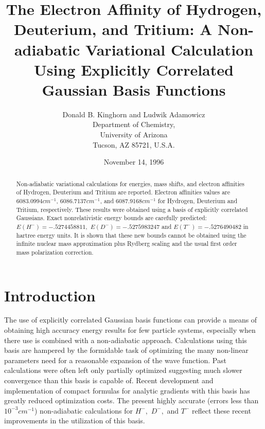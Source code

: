 \documentclass[12pt,thmsa]{article}
\begin{document}
\author{Donald B. Kinghorn and Ludwik Adamowicz \\
Department of Chemistry, \\
University of Arizona \\
Tucson, AZ 85721, U.S.A.}
\title{The Electron Affinity of Hydrogen, Deuterium, and Tritium: A Non-adiabatic
Variational Calculation Using Explicitly Correlated Gaussian Basis Functions}
\date{November 14, 1996}
\maketitle

\begin{abstract}
Non-adiabatic variational calculations for energies, mass shifts, and
electron affinities of Hydrogen, Deuterium and Tritium are reported.
Electron affinities values are 6083.0994$cm^{-1}$, 6086.7137$cm^{-1}$, and
6087.9168$cm^{-1}$ for Hydrogen, Deuterium and Tritium, respectively. These
results were obtained using a basis of explicitly correlated Gaussians.
Exact nonrelativistic energy bounds are carefully predicted: $E\left(
H^{-}\right) =-.5274458811,\,\,E\left( D^{-}\right) =-.5275983247$ and $%
E\left( T^{-}\right) =-.5276490482$ in hartree energy units. It is shown
that these new bounds cannot be obtained using the infinite nuclear mass
approximation plus Rydberg scaling and the usual first order mass
polarization correction.
\end{abstract}

\section{Introduction}

The use of explicitly correlated Gaussian basis functions can provide a
means of obtaining high accuracy energy results for few particle systems,
especially when there use is combined with a non-adiabatic approach.
Calculations using this basis are hampered by the formidable task of
optimizing the many non-linear parameters need for a reasonable expansion of
the wave function. Past calculations were often left only partially
optimized suggesting much slower convergence than this basis is capable of.
Recent development and implementation of compact formulas for analytic
gradients with this basis has greatly reduced optimization costs\cite
{Kinghorn95a,Kinghorn95b}. The present highly accurate (errors less than $%
10^{-3}cm^{-1}$) non-adiabatic calculations for $H^{-},\,\,D^{-},\,\,$and $%
T^{-}$ reflect these recent improvements in the utilization of this basis.
\end{document}
